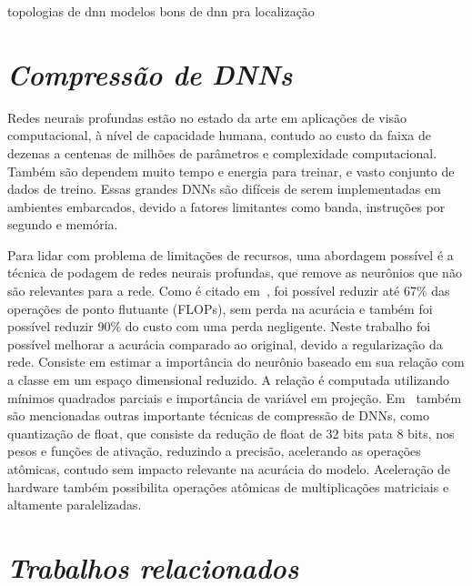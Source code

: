 topologias de dnn  modelos bons de dnn pra localização 





\section{\textit{Compressão de DNNs}}\label{sec:Cap2_MR}


Redes neurais profundas estão no estado da arte em aplicações de visão computacional, à nível de capacidade humana, contudo ao custo da faixa de dezenas a centenas de milhões de parâmetros e complexidade computacional. Também são dependem muito tempo e energia para treinar, e vasto conjunto de dados de treino. Essas grandes DNNs são difíceis de serem implementadas em ambientes embarcados, devido a fatores limitantes como banda, instruções por segundo e memória. 

Para lidar com problema de limitações de recursos, uma abordagem possível é a técnica de podagem de redes neurais profundas, que remove as neurônios que não são relevantes para a rede. Como é citado em~\cite{jordao2019pruning}, foi possível reduzir até 67\% das operações de ponto flutuante (FLOPs), sem perda na acurácia e também foi possível reduzir 90\% do custo com uma perda negligente. Neste trabalho foi possível melhorar a acurácia comparado ao original, devido a regularização da rede. Consiste em estimar a importância do neurônio baseado em sua relação com a classe em um espaço dimensional reduzido. A relação é computada utilizando mínimos quadrados parciais e importância de variável em projeção. Em~\cite{jordao2019pruning} também são mencionadas outras importante técnicas de compressão de DNNs, como quantização de float, que consiste da redução de float de 32 bits pata 8 bits, nos pesos e funções de ativação, reduzindo a precisão, acelerando as operações atômicas, contudo sem impacto relevante na acurácia do modelo. Aceleração de hardware também possibilita operações atômicas de multiplicações matriciais e altamente paralelizadas. 

\section{\textit{Trabalhos relacionados}}\label{sec:Cap2_MR}


